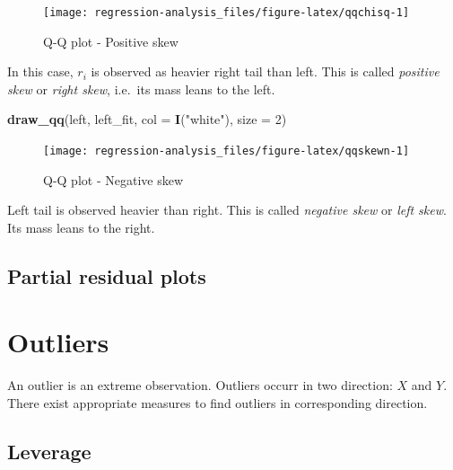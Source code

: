 \documentclass[]{book}
\newenvironment{Shaded}{\begin{snugshade}}{\end{snugshade}}
\newcommand{\DataTypeTok}[1]{\textcolor[rgb]{0.13,0.29,0.53}{#1}}
\newcommand{\DecValTok}[1]{\textcolor[rgb]{0.00,0.00,0.81}{#1}}
\newcommand{\KeywordTok}[1]{\textcolor[rgb]{0.13,0.29,0.53}{\textbf{#1}}}
\newcommand{\NormalTok}[1]{#1}
\newcommand{\StringTok}[1]{\textcolor[rgb]{0.31,0.60,0.02}{#1}}
\theoremstyle{definition}
\theoremstyle{definition}
\theoremstyle{definition}
\theoremstyle{remark}
\begin{document}
\begin{figure}[H]

{\centering \texttt{[image: regression-analysis\_files/figure-latex/qqchisq-1]} 

}

\caption{Q-Q plot - Positive skew}\label{fig:qqchisq}
\end{figure}

In this case, \(r_i\) is observed as heavier right tail than left. This is called \emph{positive skew} or \emph{right skew}, i.e.~its mass leans to the left.

\begin{Shaded}
\begin{Highlighting}[]
\KeywordTok{draw_qq}\NormalTok{(left, left_fit, }\DataTypeTok{col =} \KeywordTok{I}\NormalTok{(}\StringTok{"white"}\NormalTok{), }\DataTypeTok{size =} \DecValTok{2}\NormalTok{)}
\end{Highlighting}
\end{Shaded}

\begin{figure}[H]

{\centering \texttt{[image: regression-analysis\_files/figure-latex/qqskewn-1]} 

}

\caption{Q-Q plot - Negative skew}\label{fig:qqskewn}
\end{figure}

Left tail is observed heavier than right. This is called \emph{negative skew} or \emph{left skew}. Its mass leans to the right.

\hypertarget{partial-residual-plots}{%
\subsection{Partial residual plots}\label{partial-residual-plots}}

\hypertarget{outliers}{%
\section{Outliers}\label{outliers}}

An outlier is an extreme observation. Outliers occurr in two direction: \(X\) and \(Y\). There exist appropriate measures to find outliers in corresponding direction.

\hypertarget{leverage}{%
\subsection{Leverage}\label{leverage}}
\end{document}
